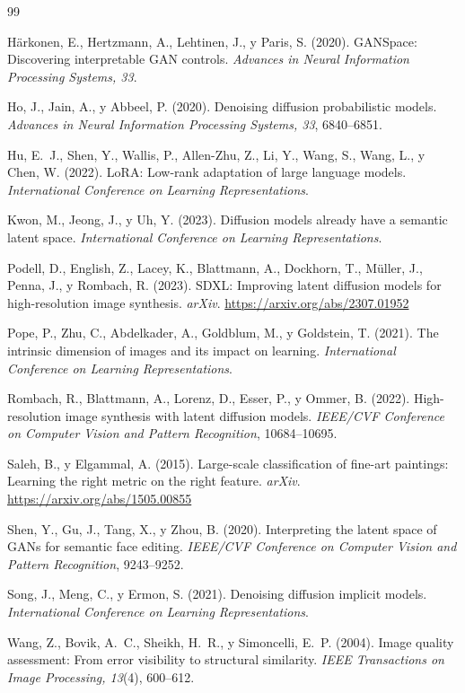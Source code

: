 \documentclass[12pt, a4paper, twoside]{book}
\begin{document}
\begin{thebibliography}{99}

H\"{a}rkonen, E., Hertzmann, A., Lehtinen, J., y Paris, S. (2020).
GANSpace: Discovering interpretable GAN controls.
\textit{Advances in Neural Information Processing Systems, 33}.

Ho, J., Jain, A., y Abbeel, P. (2020).
Denoising diffusion probabilistic models.
\textit{Advances in Neural Information Processing Systems, 33}, 6840--6851.

Hu, E.~J., Shen, Y., Wallis, P., Allen-Zhu, Z., Li, Y., Wang, S., Wang, L., y Chen, W. (2022).
LoRA: Low-rank adaptation of large language models.
\textit{International Conference on Learning Representations}.

Kwon, M., Jeong, J., y Uh, Y. (2023).
Diffusion models already have a semantic latent space.
\textit{International Conference on Learning Representations}.

Podell, D., English, Z., Lacey, K., Blattmann, A., Dockhorn, T., M\"{u}ller, J.,
Penna, J., y Rombach, R. (2023).
SDXL: Improving latent diffusion models for high-resolution image synthesis.
\textit{arXiv}. \url{https://arxiv.org/abs/2307.01952}

Pope, P., Zhu, C., Abdelkader, A., Goldblum, M., y Goldstein, T. (2021).
The intrinsic dimension of images and its impact on learning.
\textit{International Conference on Learning Representations}.

Rombach, R., Blattmann, A., Lorenz, D., Esser, P., y Ommer, B. (2022).
High-resolution image synthesis with latent diffusion models.
\textit{IEEE/CVF Conference on Computer Vision and Pattern Recognition}, 10684--10695.

Saleh, B., y Elgammal, A. (2015).
Large-scale classification of fine-art paintings: Learning the right metric on the right feature.
\textit{arXiv}. \url{https://arxiv.org/abs/1505.00855}

Shen, Y., Gu, J., Tang, X., y Zhou, B. (2020).
Interpreting the latent space of GANs for semantic face editing.
\textit{IEEE/CVF Conference on Computer Vision and Pattern Recognition}, 9243--9252.

Song, J., Meng, C., y Ermon, S. (2021).
Denoising diffusion implicit models.
\textit{International Conference on Learning Representations}.

Wang, Z., Bovik, A.~C., Sheikh, H.~R., y Simoncelli, E.~P. (2004).
Image quality assessment: From error visibility to structural similarity.
\textit{IEEE Transactions on Image Processing, 13}(4), 600--612.

\end{thebibliography}
\end{document}
